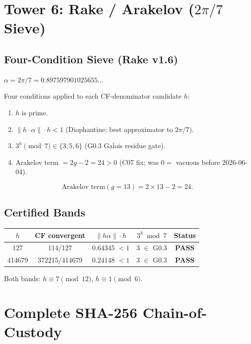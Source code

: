 \documentclass[12pt,letterpaper]{article}
\begin{document}
\section{Tower 6: Rake / Arakelov ($2\pi/7$ Sieve)}

\subsection{Four-Condition Sieve (Rake v1.6)}

$\alpha = 2\pi/7 = 0.897597901025655\ldots$

Four conditions applied to each CF-denominator candidate $h$:
\begin{enumerate}
  \item $h$ is prime.
  \item $\|h \cdot \alpha\| \cdot h < 1$
    (Diophantine: best approximator to $2\pi/7$).
  \item $3^h \pmod{7} \in \{3,5,6\}$
    (G0.3 Galois residue gate).
  \item Arakelov term $= 2g - 2 = 24 > 0$
    (C07 fix; was $0 =$ vacuous before 2026-06-04).
\end{enumerate}

\begin{equation}
  \text{Arakelov term}(g = 13) = 2 \times 13 - 2 = 24.
  \label{eq:arakelov_rake}
\end{equation}

\subsection{Certified Bands}

\begin{center}
\begin{tabular}{ccccc}
\toprule
$h$ & CF convergent & $\|h\alpha\| \cdot h$ & $3^h \bmod 7$ & Status \\
\midrule
127 & 114/127 & 0.64345 $< 1$ & 3 $\in$ G0.3 & \textbf{PASS} \\
414679 & 372215/414679 & 0.24148 $< 1$ & 3 $\in$ G0.3 & \textbf{PASS} \\
\bottomrule
\end{tabular}
\end{center}

Both bands: $h \equiv 7 \pmod{12}$, $h \equiv 1 \pmod{6}$.

\newpage
\section{Complete SHA-256 Chain-of-Custody}
\end{document}
